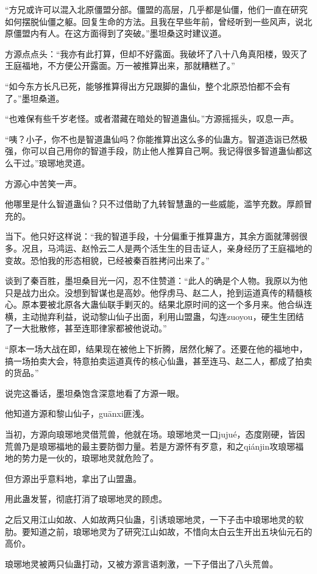 \begin{this_body}
“方兄或许可以混入北原僵盟分部。僵盟的高层，几乎都是仙僵，他们一直在研究如何摆脱仙僵之躯。回复生命的方法。且我在早些年前，曾经听到一些风声，说北原僵盟内有人。在这方面得到了突破。”墨坦桑这时建议道。

方源点点头：“我亦有此打算，但却不好露面。我破坏了八十八角真阳楼，毁灭了王庭福地，不方便公开露面。万一被推算出来，那就糟糕了。”

“如今东方长凡已死，能够推算得出方兄跟脚的蛊仙，整个北原恐怕都不会有了。”墨坦桑道。

“也难保有些千岁老怪。或者潜藏在暗处的智道蛊仙。”方源摇摇头，叹息一声。

“咦？小子，你不也是智道蛊仙吗？你能推算出这么多的仙蛊方。智道造诣已然极强，你可以自己用你的智道手段，防止他人推算自己啊。我记得很多智道蛊仙都这么干过。”琅琊地灵道。

方源心中苦笑一声。

他哪里是什么智道蛊仙？只不过借助了九转智慧蛊的一些威能，滥竽充数。厚颜冒充的。

当下。他只好这样说：“我的智道手段，十分偏重于推算蛊方，其余方面就薄弱很多。况且，马鸿运、赵怜云二人是两个活生生的目击证人，亲身经历了王庭福地的变故。恐怕我的形态相貌，已经被秦百胜拷问出来了。”

谈到了秦百胜，墨坦桑目光一闪，忍不住赞道：“此人的确是个人物。我原以为他只是战力出众。没想到智谋也是高妙。他俘虏马、赵二人，抢到运道真传的精髓核心。原本要被北原各大蛊仙联手剿灭的。结果北原时间的这一个多月来。他合纵连横，主动抛弃利益，说动黎山仙子出面，利用山盟蛊，勾连zuoyou，硬生生团结了一大批散修，甚至连耶律家都被他说动。”

“原本一场大战在即，结果现在被他上下折腾，居然化解了。还要在他的福地中，搞一场拍卖大会，特意拍卖运道真传的核心仙蛊，甚至连马、赵二人，都成了拍卖的货品。”

说完这番话，墨坦桑饱含深意地看了方源一眼。

他知道方源和黎山仙子，guānxi匪浅。

当初，方源向琅琊地灵借荒兽，他就在场。琅琊地灵一口jujué，态度刚硬，皆因荒兽乃是琅琊福地的最主要防御力量。若是方源怀有歹意，和之qiánjin攻琅琊福地的势力是一伙的，琅琊地灵就危险了。

但方源出乎意料地，拿出了山盟蛊。

用此蛊发誓，彻底打消了琅琊地灵的顾虑。

之后又用江山如故、人如故两只仙蛊，引诱琅琊地灵，一下子击中琅琊地灵的软肋。要知道之前，琅琊地灵为了研究江山如故，不惜向太白云生开出五块仙元石的高价。

琅琊地灵被两只仙蛊打动，又被方源言语刺激，一下子借出了八头荒兽。


\end{this_body}
